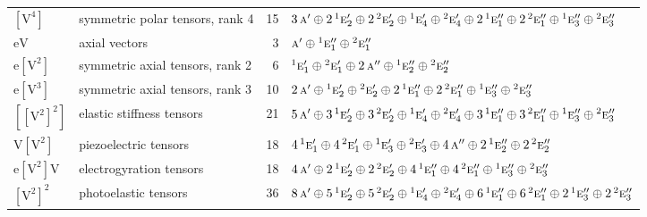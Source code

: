 \documentclass[10pt,a4paper]{article}
\numberwithin{equation}{section}
\newcommand{\irr}[1]{\text{\normalfont\scshape #1}}
\newcommand{\conjpair}[1]{{}^{#1}}
\newcommand{\jahn}[1]{\mathrm{#1}}
\newlength{\fillwidth}\newlength{\cellwidth}\newlength{\colwidth}
\begin{document}
{\begin{longtable}{@{}llr>{\RaggedRight\arraybackslash}p{\fillwidth}@{}}
$\jahn{[V^{4}]}$ & symmetric polar tensors, rank 4 & 15 & $3\,\irr{a}' \oplus\allowbreak 2\,\conjpair{1}\irr{e}_{2}' \oplus\allowbreak 2\,\conjpair{2}\irr{e}_{2}' \oplus\allowbreak \conjpair{1}\irr{e}_{4}' \oplus\allowbreak \conjpair{2}\irr{e}_{4}' \oplus\allowbreak 2\,\conjpair{1}\irr{e}_{1}'' \oplus\allowbreak 2\,\conjpair{2}\irr{e}_{1}'' \oplus\allowbreak \conjpair{1}\irr{e}_{3}'' \oplus\allowbreak \conjpair{2}\irr{e}_{3}''$\\
$\jahn{eV}$ & axial vectors & 3 & $\irr{a}' \oplus\allowbreak \conjpair{1}\irr{e}_{1}'' \oplus\allowbreak \conjpair{2}\irr{e}_{1}''$\\
$\jahn{e[V^{2}]}$ & symmetric axial tensors, rank 2 & 6 & $\conjpair{1}\irr{e}_{1}' \oplus\allowbreak \conjpair{2}\irr{e}_{1}' \oplus\allowbreak 2\,\irr{a}'' \oplus\allowbreak \conjpair{1}\irr{e}_{2}'' \oplus\allowbreak \conjpair{2}\irr{e}_{2}''$\\
$\jahn{e[V^{3}]}$ & symmetric axial tensors, rank 3 & 10 & $2\,\irr{a}' \oplus\allowbreak \conjpair{1}\irr{e}_{2}' \oplus\allowbreak \conjpair{2}\irr{e}_{2}' \oplus\allowbreak 2\,\conjpair{1}\irr{e}_{1}'' \oplus\allowbreak 2\,\conjpair{2}\irr{e}_{1}'' \oplus\allowbreak \conjpair{1}\irr{e}_{3}'' \oplus\allowbreak \conjpair{2}\irr{e}_{3}''$\\
$\jahn{[[V^{2}]^{2}]}$ & elastic stiffness tensors & 21 & $5\,\irr{a}' \oplus\allowbreak 3\,\conjpair{1}\irr{e}_{2}' \oplus\allowbreak 3\,\conjpair{2}\irr{e}_{2}' \oplus\allowbreak \conjpair{1}\irr{e}_{4}' \oplus\allowbreak \conjpair{2}\irr{e}_{4}' \oplus\allowbreak 3\,\conjpair{1}\irr{e}_{1}'' \oplus\allowbreak 3\,\conjpair{2}\irr{e}_{1}'' \oplus\allowbreak \conjpair{1}\irr{e}_{3}'' \oplus\allowbreak \conjpair{2}\irr{e}_{3}''$\\
$\jahn{V[V^{2}]}$ & piezoelectric tensors & 18 & $4\,\conjpair{1}\irr{e}_{1}' \oplus\allowbreak 4\,\conjpair{2}\irr{e}_{1}' \oplus\allowbreak \conjpair{1}\irr{e}_{3}' \oplus\allowbreak \conjpair{2}\irr{e}_{3}' \oplus\allowbreak 4\,\irr{a}'' \oplus\allowbreak 2\,\conjpair{1}\irr{e}_{2}'' \oplus\allowbreak 2\,\conjpair{2}\irr{e}_{2}''$\\
$\jahn{e[V^{2}]V}$ & electrogyration tensors & 18 & $4\,\irr{a}' \oplus\allowbreak 2\,\conjpair{1}\irr{e}_{2}' \oplus\allowbreak 2\,\conjpair{2}\irr{e}_{2}' \oplus\allowbreak 4\,\conjpair{1}\irr{e}_{1}'' \oplus\allowbreak 4\,\conjpair{2}\irr{e}_{1}'' \oplus\allowbreak \conjpair{1}\irr{e}_{3}'' \oplus\allowbreak \conjpair{2}\irr{e}_{3}''$\\
$\jahn{[V^{2}]^{2}}$ & photoelastic tensors & 36 & $8\,\irr{a}' \oplus\allowbreak 5\,\conjpair{1}\irr{e}_{2}' \oplus\allowbreak 5\,\conjpair{2}\irr{e}_{2}' \oplus\allowbreak \conjpair{1}\irr{e}_{4}' \oplus\allowbreak \conjpair{2}\irr{e}_{4}' \oplus\allowbreak 6\,\conjpair{1}\irr{e}_{1}'' \oplus\allowbreak 6\,\conjpair{2}\irr{e}_{1}'' \oplus\allowbreak 2\,\conjpair{1}\irr{e}_{3}'' \oplus\allowbreak 2\,\conjpair{2}\irr{e}_{3}''$\\

\end{longtable}}
\end{document}
